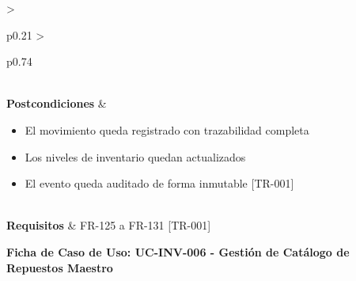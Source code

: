 \begin{longtable}{>{\raggedright\arraybackslash}p{0.21\textwidth} >{\raggedright\arraybackslash}p{0.74\textwidth}}
{\begin{enumerate}[leftmargin=1.5em, nosep, topsep=0pt]
\end{enumerate} \vspace{2pt}} \\
\textbf{Postcondiciones} & \parbox[t]{\linewidth}{\vspace{2pt} \begin{itemize}[leftmargin=1.5em, nosep, topsep=0pt]
\item El movimiento queda registrado con trazabilidad completa
\item Los niveles de inventario quedan actualizados
\item El evento queda auditado de forma inmutable [TR-001]
\end{itemize} \vspace{2pt}} \\
\textbf{Requisitos} & FR-125 a FR-131 [TR-001] \\ \bottomrule
\end{longtable}\normalsize\vspace{1em}
\noindent\textbf{Ficha de Caso de Uso: UC-INV-006 - Gestión de Catálogo de Repuestos Maestro}
\footnotesize\setlength{\tabcolsep}{4pt}\renewcommand{\arraystretch}{1.2}
